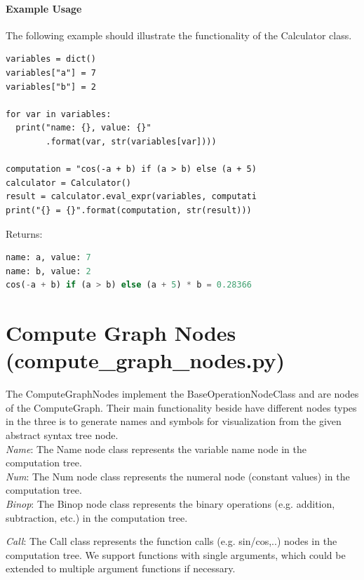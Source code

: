 \paragraph{Example Usage}
The following example should illustrate the functionality of the Calculator class.
\begin{verbatim}
variables = dict()                                
variables["a"] = 7                                
variables["b"] = 2                                

for var in variables:                             
  print("name: {}, value: {}"
        .format(var, str(variables[var])))

computation = "cos(-a + b) if (a > b) else (a + 5)
calculator = Calculator()                         
result = calculator.eval_expr(variables, computati
print("{} = {}".format(computation, str(result))) 
\end{verbatim}
Returns:
\begin{lstlisting}[showstringspaces=false, frame=single, language=Python]
name: a, value: 7
name: b, value: 2
cos(-a + b) if (a > b) else (a + 5) * b = 0.28366
\end{lstlisting}






\section{Compute Graph Nodes (compute\_graph\_nodes.py)}
The ComputeGraphNodes implement the BaseOperationNodeClass and are nodes of the ComputeGraph. Their main functionality beside have different nodes types in the three is to generate names and symbols for visualization from the given abstract syntax tree node. \\

\textit{Name}: The Name node class represents the variable name node in the computation tree. \\

\textit{Num}: The Num node class represents the numeral node (constant values) in the computation tree.\\


\textit{Binop}: The Binop node class represents the binary operations (e.g. addition, subtraction, etc.) in the computation tree.

\textit{Call}: The Call class represents the function calls (e.g. sin/cos,..) nodes in the computation tree. We support functions with single arguments, which could be extended to multiple argument functions if necessary.\\

